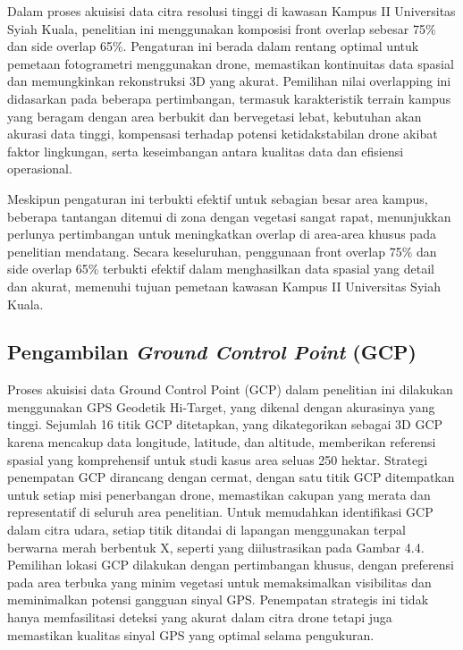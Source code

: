 Dalam proses akuisisi data citra resolusi tinggi di kawasan Kampus II Universitas Syiah Kuala, penelitian ini menggunakan komposisi front overlap sebesar 75\% dan side overlap 65\%. Pengaturan ini berada dalam rentang optimal untuk pemetaan fotogrametri menggunakan drone, memastikan kontinuitas data spasial dan memungkinkan rekonstruksi 3D yang akurat. Pemilihan nilai overlapping ini didasarkan pada beberapa pertimbangan, termasuk karakteristik terrain kampus yang beragam dengan area berbukit dan bervegetasi lebat, kebutuhan akan akurasi data tinggi, kompensasi terhadap potensi ketidakstabilan drone akibat faktor lingkungan, serta keseimbangan antara kualitas data dan efisiensi operasional.

Meskipun pengaturan ini terbukti efektif untuk sebagian besar area kampus, beberapa tantangan ditemui di zona dengan vegetasi sangat rapat, menunjukkan perlunya pertimbangan untuk meningkatkan overlap di area-area khusus pada penelitian mendatang. Secara keseluruhan, penggunaan front overlap 75\% dan side overlap 65\% terbukti efektif dalam menghasilkan data spasial yang detail dan akurat, memenuhi tujuan pemetaan kawasan Kampus II Universitas Syiah Kuala.

\subsection{Pengambilan \textit{Ground Control Point} (GCP)}

Proses akuisisi data Ground Control Point (GCP) dalam penelitian ini dilakukan menggunakan GPS Geodetik Hi-Target, yang dikenal dengan akurasinya yang tinggi. Sejumlah 16 titik GCP ditetapkan, yang dikategorikan sebagai 3D GCP karena mencakup data longitude, latitude, dan altitude, memberikan referensi spasial yang komprehensif untuk studi kasus area seluas 250 hektar. Strategi penempatan GCP dirancang dengan cermat, dengan satu titik GCP ditempatkan untuk setiap misi penerbangan drone, memastikan cakupan yang merata dan representatif di seluruh area penelitian. Untuk memudahkan identifikasi GCP dalam citra udara, setiap titik ditandai di lapangan menggunakan terpal berwarna merah berbentuk X, seperti yang diilustrasikan pada Gambar 4.4. Pemilihan lokasi GCP dilakukan dengan pertimbangan khusus, dengan preferensi pada area terbuka yang minim vegetasi untuk memaksimalkan visibilitas dan meminimalkan potensi gangguan sinyal GPS. Penempatan strategis ini tidak hanya memfasilitasi deteksi yang akurat dalam citra drone tetapi juga memastikan kualitas sinyal GPS yang optimal selama pengukuran.

